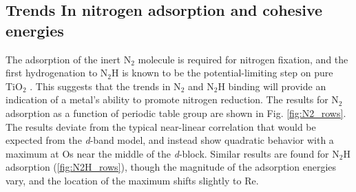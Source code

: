 
\subsection{Trends In nitrogen adsorption and cohesive energies}
\label{sec:reactivity}

The adsorption of the inert N$_2$ molecule is required for nitrogen fixation, and the first hydrogenation to N$_2$H is known to be the potential-limiting step on pure TiO$_2$ \cite{Comer_2018}. This suggests that the trends in N$_2$ and N$_2$H binding will provide an indication of a metal's ability to promote nitrogen reduction. The results for N$_2$ adsorption as a function of periodic table group are shown in Fig. \ref{fig:N2_rows}. The results deviate from the typical near-linear correlation that would be expected from the \textit{d}-band model, and instead show quadratic behavior with a maximum at Os near the middle of the \textit{d}-block. Similar results are found for N$_2$H adsorption (\ref{fig:N2H_rows}), though the magnitude of the adsorption energies vary, and the location of the maximum shifts slightly to Re. 


